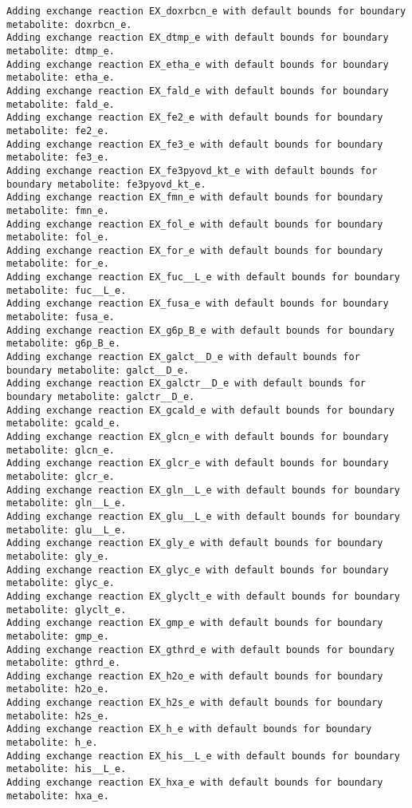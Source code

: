 \documentclass[
  letterpaper,
  DIV=11,
  numbers=noendperiod]{scrartcl}
\begin{document}
\begin{verbatim}
Adding exchange reaction EX_doxrbcn_e with default bounds for boundary metabolite: doxrbcn_e.
Adding exchange reaction EX_dtmp_e with default bounds for boundary metabolite: dtmp_e.
Adding exchange reaction EX_etha_e with default bounds for boundary metabolite: etha_e.
Adding exchange reaction EX_fald_e with default bounds for boundary metabolite: fald_e.
Adding exchange reaction EX_fe2_e with default bounds for boundary metabolite: fe2_e.
Adding exchange reaction EX_fe3_e with default bounds for boundary metabolite: fe3_e.
Adding exchange reaction EX_fe3pyovd_kt_e with default bounds for boundary metabolite: fe3pyovd_kt_e.
Adding exchange reaction EX_fmn_e with default bounds for boundary metabolite: fmn_e.
Adding exchange reaction EX_fol_e with default bounds for boundary metabolite: fol_e.
Adding exchange reaction EX_for_e with default bounds for boundary metabolite: for_e.
Adding exchange reaction EX_fuc__L_e with default bounds for boundary metabolite: fuc__L_e.
Adding exchange reaction EX_fusa_e with default bounds for boundary metabolite: fusa_e.
Adding exchange reaction EX_g6p_B_e with default bounds for boundary metabolite: g6p_B_e.
Adding exchange reaction EX_galct__D_e with default bounds for boundary metabolite: galct__D_e.
Adding exchange reaction EX_galctr__D_e with default bounds for boundary metabolite: galctr__D_e.
Adding exchange reaction EX_gcald_e with default bounds for boundary metabolite: gcald_e.
Adding exchange reaction EX_glcn_e with default bounds for boundary metabolite: glcn_e.
Adding exchange reaction EX_glcr_e with default bounds for boundary metabolite: glcr_e.
Adding exchange reaction EX_gln__L_e with default bounds for boundary metabolite: gln__L_e.
Adding exchange reaction EX_glu__L_e with default bounds for boundary metabolite: glu__L_e.
Adding exchange reaction EX_gly_e with default bounds for boundary metabolite: gly_e.
Adding exchange reaction EX_glyc_e with default bounds for boundary metabolite: glyc_e.
Adding exchange reaction EX_glyclt_e with default bounds for boundary metabolite: glyclt_e.
Adding exchange reaction EX_gmp_e with default bounds for boundary metabolite: gmp_e.
Adding exchange reaction EX_gthrd_e with default bounds for boundary metabolite: gthrd_e.
Adding exchange reaction EX_h2o_e with default bounds for boundary metabolite: h2o_e.
Adding exchange reaction EX_h2s_e with default bounds for boundary metabolite: h2s_e.
Adding exchange reaction EX_h_e with default bounds for boundary metabolite: h_e.
Adding exchange reaction EX_his__L_e with default bounds for boundary metabolite: his__L_e.
Adding exchange reaction EX_hxa_e with default bounds for boundary metabolite: hxa_e.

\end{verbatim}
\end{document}
